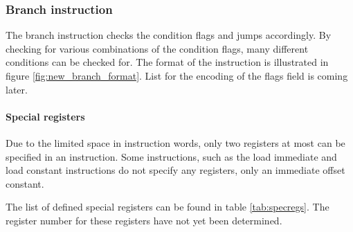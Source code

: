 \subsubsection{Branch instruction}
The branch instruction checks the condition flags and jumps accordingly. By
checking for various combinations of the condition flags, many different
conditions can be checked for. The format of the instruction is illustrated
in figure \ref{fig:new_branch_format}. List for the encoding of the flags field
is coming later.



\paragraph{Special registers}

Due to the limited space in instruction words, only two registers at most can be
specified in an instruction. Some instructions, such as the load immediate and
load constant instructions do not specify any registers, only an immediate
offset constant.

The list of defined special registers can be found in table \ref{tab:specregs}.
The register number for these registers have not yet been determined.



